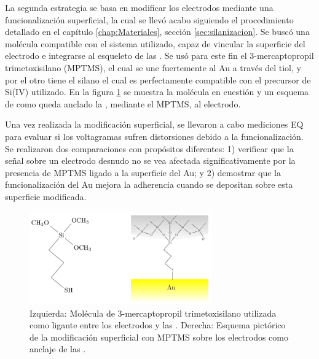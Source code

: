 					
			 La segunda estrategia se basa en modificar los electrodos mediante una funcionalización superficial, la cual se llevó acabo siguiendo el procedimiento detallado en el capítulo \ref{chap:Materiales}, sección \ref{sec:silanizacion}. Se buscó una molécula compatible con el sistema utilizado, capaz de vincular la superficie del electrodo e integrarse al esqueleto de las \pdm. Se usó para este fin el 3-mercaptopropil trimetoxisilano (MPTMS), el cual se une fuertemente al Au a través del tiol\cite{Gosser,Byun2013}, y por el otro tiene el silano el cual es perfectamente compatible con el precursor de Si(IV) utilizado\cite{Wu2014,Wu2013,Chen2011}. En la figura \ref{fig:mod_sup} se muestra la molécula en cuestión y un esquema de como queda anclado la \pdm, mediante el MPTMS, al electrodo.
		
			 Una vez realizada la modificación superficial, se llevaron a cabo mediciones EQ para evaluar si los voltagramas sufren distorsiones debido a la funcionalización. Se realizaron dos comparaciones con propósitos diferentes: 1) verificar que la señal sobre un electrodo desnudo no se vea afectada significativamente por la presencia de MPTMS ligado a la superficie del Au; y 2) demostrar que la funcionalización del Au mejora la adherencia cuando se depositan \pdm\space sobre esta superficie modificada.

			 \begin{figure}[!ht]
							\begin{center}
							\includegraphics[width=0.70\textwidth]{Esquemas/mod_sup.pdf}
							\caption[Modificación superficial de los electrodos.]{Izquierda: Molécula de  3-mercaptopropil trimetoxisilano utilizada como ligante entre los electrodos y las \pdm. Derecha: Esquema pictórico de la modificación superficial con MPTMS sobre los electrodos como anclaje de las \pdm.}
							\label{fig:mod_sup}
							\end{center}
							\end{figure}
										
